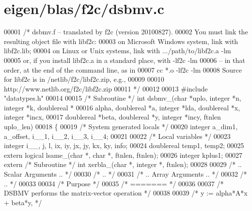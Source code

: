 \hypertarget{eigen_2blas_2f2c_2dsbmv_8c_source}{}\section{eigen/blas/f2c/dsbmv.c}
\label{eigen_2blas_2f2c_2dsbmv_8c_source}

\begin{DoxyCode}
00001 \textcolor{comment}{/* dsbmv.f -- translated by f2c (version 20100827).}
00002 \textcolor{comment}{   You must link the resulting object file with libf2c:}
00003 \textcolor{comment}{    on Microsoft Windows system, link with libf2c.lib;}
00004 \textcolor{comment}{    on Linux or Unix systems, link with .../path/to/libf2c.a -lm}
00005 \textcolor{comment}{    or, if you install libf2c.a in a standard place, with -lf2c -lm}
00006 \textcolor{comment}{    -- in that order, at the end of the command line, as in}
00007 \textcolor{comment}{        cc *.o -lf2c -lm}
00008 \textcolor{comment}{    Source for libf2c is in /netlib/f2c/libf2c.zip, e.g.,}
00009 \textcolor{comment}{}
00010 \textcolor{comment}{        http://www.netlib.org/f2c/libf2c.zip}
00011 \textcolor{comment}{*/}
00012 
00013 \textcolor{preprocessor}{#include "datatypes.h"}
00014 
00015 \textcolor{comment}{/* Subroutine */} \textcolor{keywordtype}{int} dsbmv\_(\textcolor{keywordtype}{char} *uplo, integer *n, integer *k, doublereal *
00016     alpha, doublereal *a, integer *lda, doublereal *x, integer *incx, 
00017     doublereal *beta, doublereal *y, integer *incy, ftnlen uplo\_len)
00018 \{
00019     \textcolor{comment}{/* System generated locals */}
00020     integer a\_dim1, a\_offset, i\_\_1, i\_\_2, i\_\_3, i\_\_4;
00021 
00022     \textcolor{comment}{/* Local variables */}
00023     integer i\_\_, j, l, ix, iy, jx, jy, kx, ky, info;
00024     doublereal temp1, temp2;
00025     \textcolor{keyword}{extern} logical lsame\_(\textcolor{keywordtype}{char} *, \textcolor{keywordtype}{char} *, ftnlen, ftnlen);
00026     integer kplus1;
00027     \textcolor{keyword}{extern} \textcolor{comment}{/* Subroutine */} \textcolor{keywordtype}{int} xerbla\_(\textcolor{keywordtype}{char} *, integer *, ftnlen);
00028 
00029 \textcolor{comment}{/*     .. Scalar Arguments .. */}
00030 \textcolor{comment}{/*     .. */}
00031 \textcolor{comment}{/*     .. Array Arguments .. */}
00032 \textcolor{comment}{/*     .. */}
00033 
00034 \textcolor{comment}{/*  Purpose */}
00035 \textcolor{comment}{/*  ======= */}
00036 
00037 \textcolor{comment}{/*  DSBMV  performs the matrix-vector  operation */}
00038 
00039 \textcolor{comment}{/*     y := alpha*A*x + beta*y, */}

\end{DoxyCode}
